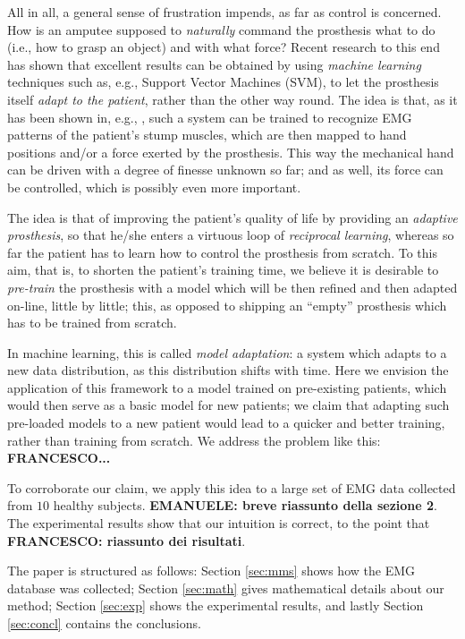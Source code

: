 All in all, a general sense of frustration impends, as far as control
is concerned. How is an amputee supposed to \emph{naturally} command
the prosthesis what to do (i.e., how to grasp an object) and with what
force? Recent research to this end has shown that excellent results
can be obtained by using \emph{machine learning} techniques such as,
e.g., Support Vector Machines (SVM), to let the prosthesis itself
\emph{adapt to the patient}, rather than the other way round. The idea
is that, as it has been shown in, e.g.,
\cite{smagt,dunlop,2008.ICRA,2008.BioCyb,Sebelius2005}, such a system
can be trained to recognize EMG patterns of the patient's stump
muscles, which are then mapped to hand positions and/or a force
exerted by the prosthesis. This way the mechanical hand can be driven
with a degree of finesse unknown so far; and as well, its force can be
controlled, which is possibly even more important.

The idea is that of improving the patient's quality of life by
providing an \emph{adaptive prosthesis}, so that he/she enters a
virtuous loop of \emph{reciprocal learning}, whereas so far the
patient has to learn how to control the prosthesis from scratch. To
this aim, that is, to shorten the patient's training time, we believe it is
desirable to \emph{pre-train} the prosthesis with a model which will
be then refined and then adapted on-line, little by little; this, as
opposed to shipping an ``empty'' prosthesis which has to be trained
from scratch.

In machine learning, this is called \emph{model adaptation}: a system
which adapts to a new data distribution, as this distribution shifts
with time. Here we envision the application of this framework to a
model trained on pre-existing patients, which would then serve as a
basic model for new patients; we claim that adapting such pre-loaded
models to a new patient would lead to a quicker and better training,
rather than training from scratch. We address the problem like this:
\textbf{FRANCESCO...}

To corroborate our claim, we apply this idea to a large set of EMG
data collected from $10$ healthy subjects. \textbf{EMANUELE: breve
riassunto della sezione 2}. The experimental results
show that our intuition is correct, to the point that
\textbf{FRANCESCO: riassunto dei risultati}.

The paper is structured as follows: Section \ref{sec:mms} shows how
the EMG database was collected; Section \ref{sec:math} gives
mathematical details about our method; Section \ref{sec:exp} shows the
experimental results, and lastly Section \ref{sec:concl} contains the
conclusions.
